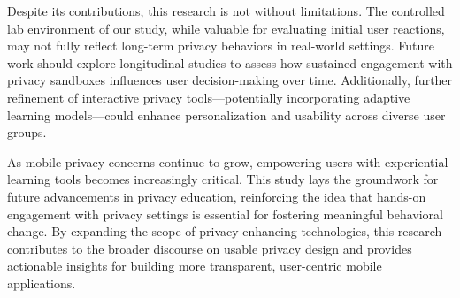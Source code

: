 \documentclass[acmlarge, nonacm]{acmart}
\begin{document}
Despite its contributions, this research is not without limitations. The controlled lab environment of our study, while valuable for evaluating initial user reactions, may not fully reflect long-term privacy behaviors in real-world settings. Future work should explore longitudinal studies to assess how sustained engagement with privacy sandboxes influences user decision-making over time. Additionally, further refinement of interactive privacy tools—potentially incorporating adaptive learning models—could enhance personalization and usability across diverse user groups.

As mobile privacy concerns continue to grow, empowering users with experiential learning tools becomes increasingly critical. This study lays the groundwork for future advancements in privacy education, reinforcing the idea that hands-on engagement with privacy settings is essential for fostering meaningful behavioral change. By expanding the scope of privacy-enhancing technologies, this research contributes to the broader discourse on usable privacy design and provides actionable insights for building more transparent, user-centric mobile applications.




\end{document}
